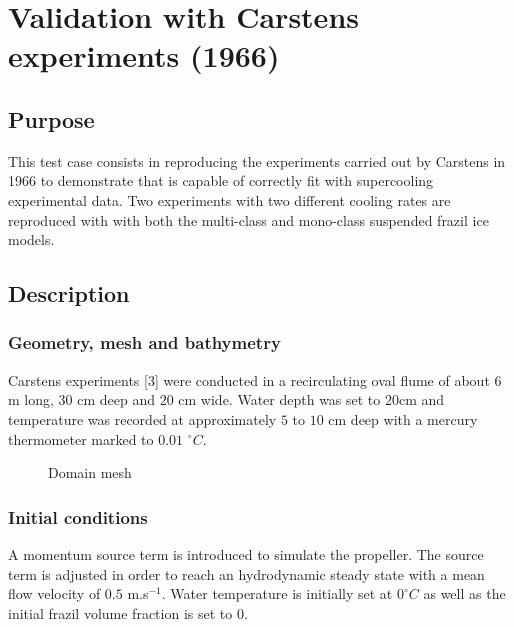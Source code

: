 \renewcommand{\labelitemi}{$\triangleright$}

\chapter{Validation with Carstens experiments (1966)}

\section{Purpose}

This test case consists in reproducing the experiments carried out by Carstens in 1966 \citep{carstens_1966} 
to demonstrate that \khione is capable of correctly fit with supercooling experimental data.
Two experiments with two different cooling rates are reproduced with \khione 
with both the multi-class and mono-class suspended frazil ice models.

\section{Description}

\subsection{Geometry, mesh and bathymetry}

Carstens experiments [3] were conducted in a recirculating oval flume of about $6$ m long, $30$ cm deep and $20$ cm
wide. Water depth was set to $20$cm and temperature was recorded at approximately $5$ to $10$ cm deep with
a mercury thermometer marked to $0.01$ $^\circ C$.

\begin{figure}[H]
    \begin{center}
    \end{center}
    \caption{Domain mesh}
    \label{fig:growth_mesh}
\end{figure}

\subsection{Initial conditions}

A momentum source term is introduced to simulate the propeller. The source
term is adjusted in order to reach an hydrodynamic steady state with a mean flow velocity of $0.5$ m.s$^{-1}$.
Water temperature is initially set at $0^\circ C$ as well as the initial frazil volume fraction is set to $0$.

